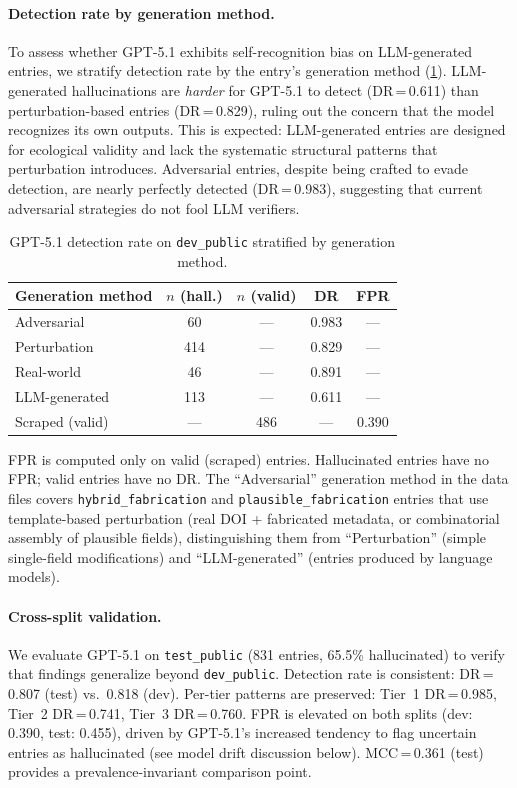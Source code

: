 \paragraph{Detection rate by generation method.}
To assess whether GPT-5.1 exhibits self-recognition bias on LLM-generated entries, we stratify detection rate by the entry's generation method (\cref{tab:stratified_dr}).
LLM-generated hallucinations are \emph{harder} for GPT-5.1 to detect (DR\,=\,0.611) than perturbation-based entries (DR\,=\,0.829), ruling out the concern that the model recognizes its own outputs.
This is expected: LLM-generated entries are designed for ecological validity and lack the systematic structural patterns that perturbation introduces.
Adversarial entries, despite being crafted to evade detection, are nearly perfectly detected (DR\,=\,0.983), suggesting that current adversarial strategies do not fool LLM verifiers.

\begin{table}[t]
\caption{GPT-5.1 detection rate on \texttt{dev\_public} stratified by generation method.}
\label{tab:stratified_dr}
\centering
\small
\begin{tabular}{lcccc}
\toprule
\textbf{Generation method} & \textbf{$n$ (hall.)} & \textbf{$n$ (valid)} & \textbf{DR} & \textbf{FPR} \\
\midrule
Adversarial      & 60  & ---  & 0.983 & --- \\
Perturbation     & 414 & ---  & 0.829 & --- \\
Real-world       & 46  & ---  & 0.891 & --- \\
LLM-generated    & 113 & ---  & 0.611 & --- \\
Scraped (valid)  & --- & 486  & ---   & 0.390 \\
\bottomrule
\end{tabular}
\par\vspace{2pt}
{\footnotesize FPR is computed only on valid (scraped) entries. Hallucinated entries have no FPR; valid entries have no DR.
The ``Adversarial'' generation method in the data files covers \texttt{hybrid\_fabrication} and \texttt{plausible\_fabrication} entries that use template-based perturbation (real DOI + fabricated metadata, or combinatorial assembly of plausible fields), distinguishing them from ``Perturbation'' (simple single-field modifications) and ``LLM-generated'' (entries produced by language models).}
\end{table}

\paragraph{Cross-split validation.}
We evaluate GPT-5.1 on \texttt{test\_public} (831 entries, 65.5\% hallucinated) to verify that findings generalize beyond \texttt{dev\_public}.
Detection rate is consistent: DR\,=\,0.807 (test) vs.\ 0.818 (dev).
Per-tier patterns are preserved: Tier~1 DR\,=\,0.985, Tier~2 DR\,=\,0.741, Tier~3 DR\,=\,0.760.
FPR is elevated on both splits (dev: 0.390, test: 0.455), driven by GPT-5.1's increased tendency to flag uncertain entries as hallucinated (see model drift discussion below).
MCC\,=\,0.361 (test) provides a prevalence-invariant comparison point.

